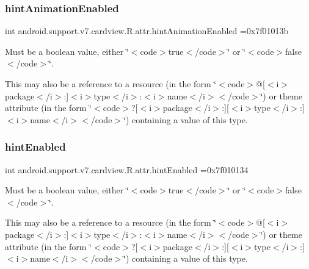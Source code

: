 \subsubsection{\texorpdfstring{hint\+Animation\+Enabled}{hintAnimationEnabled}}
{\footnotesize\ttfamily int android.\+support.\+v7.\+cardview.\+R.\+attr.\+hint\+Animation\+Enabled =0x7f01013b\hspace{0.3cm}{\ttfamily [static]}}

Must be a boolean value, either \char`\"{}$<$code$>$true$<$/code$>$\char`\"{} or \char`\"{}$<$code$>$false$<$/code$>$\char`\"{}. 

This may also be a reference to a resource (in the form \char`\"{}$<$code$>$@\mbox{[}$<$i$>$package$<$/i$>$\+:\mbox{]}$<$i$>$type$<$/i$>$\+:$<$i$>$name$<$/i$>$$<$/code$>$\char`\"{}) or theme attribute (in the form \char`\"{}$<$code$>$?\mbox{[}$<$i$>$package$<$/i$>$\+:\mbox{]}\mbox{[}$<$i$>$type$<$/i$>$\+:\mbox{]}$<$i$>$name$<$/i$>$$<$/code$>$\char`\"{}) containing a value of this type. \mbox{\label{classandroid_1_1support_1_1v7_1_1cardview_1_1R_1_1attr_a0b045f46ce9994e6d9faaf73f4bbc6d8}} 
\subsubsection{\texorpdfstring{hint\+Enabled}{hintEnabled}}
{\footnotesize\ttfamily int android.\+support.\+v7.\+cardview.\+R.\+attr.\+hint\+Enabled =0x7f010134\hspace{0.3cm}{\ttfamily [static]}}

Must be a boolean value, either \char`\"{}$<$code$>$true$<$/code$>$\char`\"{} or \char`\"{}$<$code$>$false$<$/code$>$\char`\"{}. 

This may also be a reference to a resource (in the form \char`\"{}$<$code$>$@\mbox{[}$<$i$>$package$<$/i$>$\+:\mbox{]}$<$i$>$type$<$/i$>$\+:$<$i$>$name$<$/i$>$$<$/code$>$\char`\"{}) or theme attribute (in the form \char`\"{}$<$code$>$?\mbox{[}$<$i$>$package$<$/i$>$\+:\mbox{]}\mbox{[}$<$i$>$type$<$/i$>$\+:\mbox{]}$<$i$>$name$<$/i$>$$<$/code$>$\char`\"{}) containing a value of this type. \mbox{\label{classandroid_1_1support_1_1v7_1_1cardview_1_1R_1_1attr_a2ed878930a7df30fd4612610d89e716a}} 
